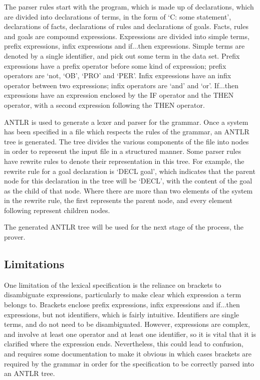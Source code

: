 \documentclass{l4proj}
\begin{document}
The parser rules start with the program, which is made up of declarations, which are divided into declarations of terms, in the form of `C: some statement', declarations of facts, declarations of rules and declarations of goals. Facts, rules and goals are compound expressions. Expressions are divided into simple terms, prefix expressions, infix expressions and if...then expressions. Simple terms are denoted by a single identifier, and pick out some term in the data set. Prefix expressions have a prefix operator before some kind of expression; prefix operators are `not, `OB', `PRO' and `PER'. Infix expressions have an infix operator between two expressions; infix operators are `and' and `or'. If...then expressions have an expression enclosed by the IF operator and the THEN operator, with a second expression following the THEN operator. 

ANTLR is used to generate a lexer and parser for the grammar. Once a system has been specified in a file which respects the rules of the grammar, an ANTLR tree is generated. The tree divides the various components of the file into nodes in order to represent the input file in a structured manner. Some parser rules have rewrite rules to denote their representation in this tree. For example, the rewrite rule for a goal declaration is `DECL goal', which indicates that the parent node for this declaration in the tree will be `DECL', with the content of the goal as the child of that node. Where there are more than two elements of the system in the rewrite rule, the first represents the parent node, and every element following represent children nodes. 

The generated ANTLR tree will be used for the next stage of the process, the prover. 

\subsection{Limitations}
One limitation of the lexical specification is the reliance on brackets to disambiguate expressions, particularly to make clear which expression a term belongs to. Brackets enclose prefix expressions, infix expressions and if...then expressions, but not identifiers, which is fairly intuitive. Identifiers are single terms, and do not need to be disambiguated. However, expressions are complex, and involve at least one operator and at least one identifier, so it is vital that it is clarified where the expression ends. Nevertheless, this could lead to confusion, and requires some documentation to make it obvious in which cases brackets are required by the grammar in order for the specification to be correctly parsed into an ANTLR tree. 
\end{document}
